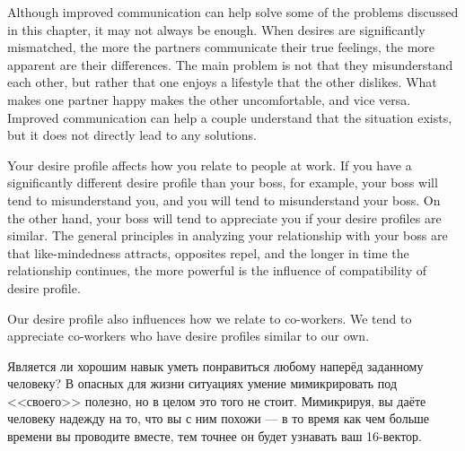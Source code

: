 \documentclass[11pt]{article}
\theoremstyle{remark}
\theoremstyle{definition}
\begin{document}
Although improved communication can help solve some of the problems discussed in this chapter, it may not always be enough. When desires are significantly mismatched, the more the partners communicate their true feelings, the more apparent are their differences. The main problem is not that they misunderstand each other, but rather that one enjoys a lifestyle that the other dislikes. What makes one partner happy makes the other uncomfortable, and vice versa. Improved communication can help a couple understand that the situation exists, but it does not directly lead to any solutions.


Your desire profile affects how you relate to people at work. If you have a significantly different desire profile than your boss, for example, your boss will tend to misunderstand you, and you will tend to misunderstand your boss. On the other hand, your boss will tend to appreciate you if your desire profiles are similar. The general principles in analyzing your relationship with your boss are that like-mindedness attracts, opposites repel, and the longer in time the relationship continues, the more powerful is the influence of compatibility of desire profile.

Our desire profile also influences how we relate to co-workers. We tend to appreciate co-workers who have desire profiles similar to our own.


Является ли хорошим навык уметь понравиться любому наперёд заданному человеку? В опасных для жизни ситуациях умение мимикрировать под <<своего>> полезно, но в целом это того не стоит. Мимикрируя, вы даёте человеку надежду на то, что вы с ним похожи --- в то время как чем больше времени вы проводите вместе, тем точнее он будет узнавать ваш 16-вектор.

\end{document}
